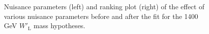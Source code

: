 \begin{figure}[H]
  \centering
  \caption{Nuisance parameters (left) and ranking plot (right) of the effect of various nuisance parameters before and after the fit for the 1400 GeV $W'_{\text{L}}$ mass hypotheses.}
  \label{fig:NuisParAndRanking_WpLH1400}
\end{figure}
